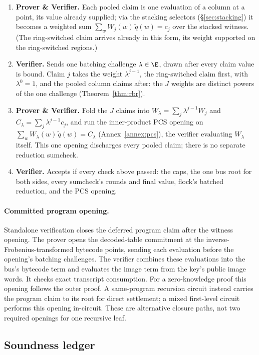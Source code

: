 \begin{enumerate}
\item \textbf{Prover \& Verifier.} Each pooled claim is one evaluation of a column at a point, its value already supplied; via the stacking selectors (\S\ref{sec:stacking}) it becomes a weighted sum $\sum_w W_j(w)\,\widetilde q(w)=c_j$ over the stacked witness. (The ring-switched claim arrives already in this form, its weight supported on the ring-switched regions.)
\item \textbf{Verifier.} Sends one batching challenge $\lambda\in\E$, drawn after every claim value is bound. Claim $j$ takes the weight $\lambda^{j-1}$, the ring-switched claim first, with $\lambda^0=1$, and the pooled column claims after: the $J$ weights are distinct powers of the one challenge (Theorem~\ref{thm:rbr}).
\item \textbf{Prover \& Verifier.} Fold the $J$ claims into $W_\lambda=\sum_j\lambda^{j-1} W_j$ and $C_\lambda=\sum_j\lambda^{j-1} c_j$, and run the inner-product PCS opening on $\sum_w W_\lambda(w)\,\widetilde q(w)=C_\lambda$ (Annex~\ref{annex:pcs}), the verifier evaluating $W_\lambda$ itself. This one opening discharges every pooled claim; there is no separate reduction sumcheck.
\item \textbf{Verifier.} Accepts if every check above passed: the caps, the one bus root for both sides, every sumcheck's rounds and final value, flock's batched reduction, and the PCS opening.
\end{enumerate}

\paragraph{Committed program opening.}
Standalone verification closes the deferred program claim after the witness opening. The prover opens the decoded-table commitment at the inverse-Frobenius-transformed bytecode points, sending each evaluation before the opening's batching challenges. The verifier combines these evaluations into the bus's bytecode term and evaluates the image term from the key's public image words. It checks exact transcript consumption. For a zero-knowledge proof this opening follows the outer proof. A same-program recursion circuit instead carries the program claim to its root for direct settlement; a mixed first-level circuit performs this opening in-circuit. These are alternative closure paths, not two required openings for one recursive leaf.

\subsection{Soundness ledger}\label{sec:e2e-ledger}

